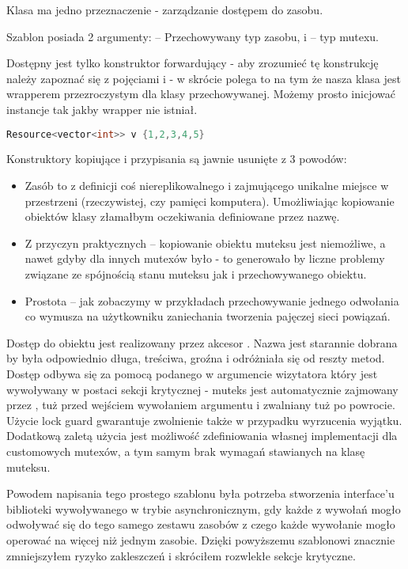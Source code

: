 
Klasa ma jedno przeznaczenie - zarządzanie dostępem do zasobu.

Szablon posiada 2 argumenty:  -- Przechowywany typ zasobu, i  -- typ mutexu.

Dostępny jest tylko konstruktor forwardujący - aby zrozumieć tę konstrukcję należy zapoznać się z pojęciami  i  - w skrócie polega to na tym że nasza klasa  jest wrapperem przezroczystym dla klasy przechowywanej. Możemy prosto inicjować instancje tak jakby wrapper  nie istniał.
\begin{lstlisting}[language=C++,style=cpp-style,aboveskip=2mm]
  Resource<vector<int>> v {1,2,3,4,5}
\end{lstlisting}

Konstruktory kopiujące i przypisania są jawnie usunięte z 3 powodów:
\begin{itemize}
\item Zasób to z definicji coś niereplikowalnego i zajmującego unikalne miejsce w przestrzeni (rzeczywistej, czy pamięci komputera). Umożliwiając kopiowanie obiektów klasy  złamałbym oczekiwania definiowane przez nazwę.
\item Z przyczyn praktycznych -- kopiowanie obiektu muteksu jest niemożliwe, a nawet gdyby dla innych mutexów było - to generowało by liczne problemy związane ze spójnością stanu muteksu jak i przechowywanego obiektu.
\item Prostota -- jak zobaczymy w przykładach przechowywanie jednego odwołania co wymusza na użytkowniku zaniechania tworzenia pajęczej sieci powiązań.
\end{itemize}

Dostęp do obiektu jest realizowany przez akcesor . Nazwa jest starannie dobrana by była odpowiednio długa, treściwa, groźna i odróżniała się od reszty metod. Dostęp odbywa się za pomocą podanego w argumencie wizytatora który jest wywoływany w postaci sekcji krytycznej - muteks jest automatycznie zajmowany przez , tuż przed wejściem wywołaniem argumentu i zwalniany tuż po powrocie. Użycie lock guard gwarantuje zwolnienie także w przypadku wyrzucenia wyjątku. Dodatkową zaletą użycia  jest możliwość zdefiniowania własnej implementacji dla customowych mutexów, a tym samym brak wymagań stawianych na klasę muteksu.

Powodem napisania tego prostego szablonu była potrzeba stworzenia interface'u biblioteki wywoływanego w trybie asynchronicznym, gdy każde z wywołań mogło odwoływać się do tego samego zestawu zasobów z czego każde wywołanie mogło operować na więcej niż jednym zasobie. Dzięki powyższemu szablonowi znacznie zmniejszyłem ryzyko zakleszczeń i skróciłem rozwlekłe sekcje krytyczne.
